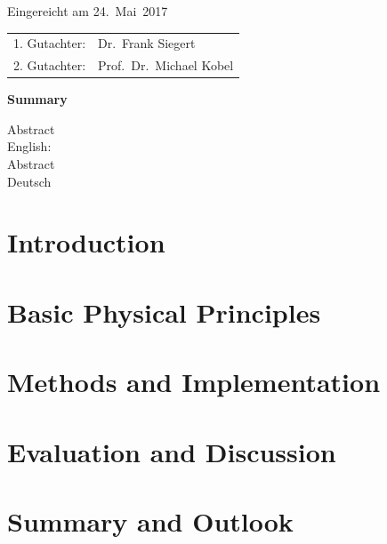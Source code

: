 \thispagestyle{empty}\vspace*{48em}

Eingereicht am 24.~Mai~2017\vspace{1.5em}
\par{\large\begin{tabular}{ll}
 1. Gutachter: & Dr.~Frank Siegert \\
 2. Gutachter: & Prof.~Dr.~Michael Kobel \\
\end{tabular}}


\newpage
\begin{center}\large\bfseries Summary\end{center}


Abstract \\ 
English: \\

\vspace{20em}
Abstract \\ 
Deutsch \\
 
 

\tableofcontents




\chapter{Introduction}

\chapter{Basic Physical Principles}


\chapter{Methods and Implementation}

\chapter{Evaluation and Discussion}


\chapter{Summary and Outlook}


\printbibliography

